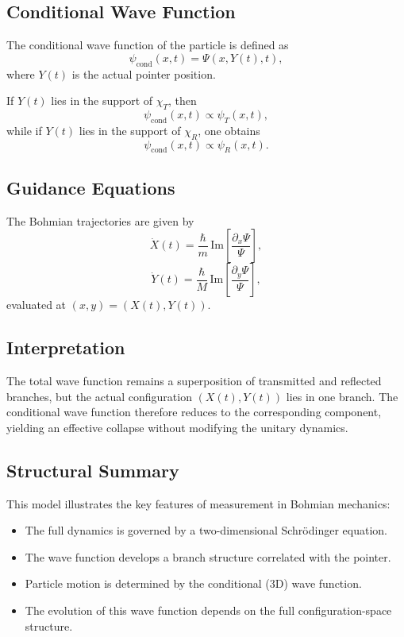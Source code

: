 \subsection{Conditional Wave Function}

The conditional wave function of the particle is defined as
\begin{equation}
\psi_{\text{cond}}(x,t) = \Psi(x, Y(t), t),
\end{equation}
where $Y(t)$ is the actual pointer position.

If $Y(t)$ lies in the support of $\chi_T$, then
\begin{equation}
\psi_{\text{cond}}(x,t) \propto \psi_T(x,t),
\end{equation}
while if $Y(t)$ lies in the support of $\chi_R$, one obtains
\begin{equation}
\psi_{\text{cond}}(x,t) \propto \psi_R(x,t).
\end{equation}

\subsection{Guidance Equations}

The Bohmian trajectories are given by
\begin{equation}
\dot X(t) = \frac{\hbar}{m}\,\mathrm{Im}\left[\frac{\partial_x \Psi}{\Psi}\right],
\end{equation}
\begin{equation}
\dot Y(t) = \frac{\hbar}{M}\,\mathrm{Im}\left[\frac{\partial_y \Psi}{\Psi}\right],
\end{equation}
evaluated at $(x,y) = (X(t),Y(t))$.

\subsection{Interpretation}

The total wave function remains a superposition of transmitted and reflected branches, but the actual configuration $(X(t),Y(t))$ lies in one branch. The conditional wave function therefore reduces to the corresponding component, yielding an effective collapse without modifying the unitary dynamics.

\subsection{Structural Summary}

This model illustrates the key features of measurement in Bohmian mechanics:

\begin{itemize}
\item The full dynamics is governed by a two-dimensional Schrödinger equation.
\item The wave function develops a branch structure correlated with the pointer.
\item Particle motion is determined by the conditional (3D) wave function.
\item The evolution of this wave function depends on the full configuration-space structure.
\end{itemize}
